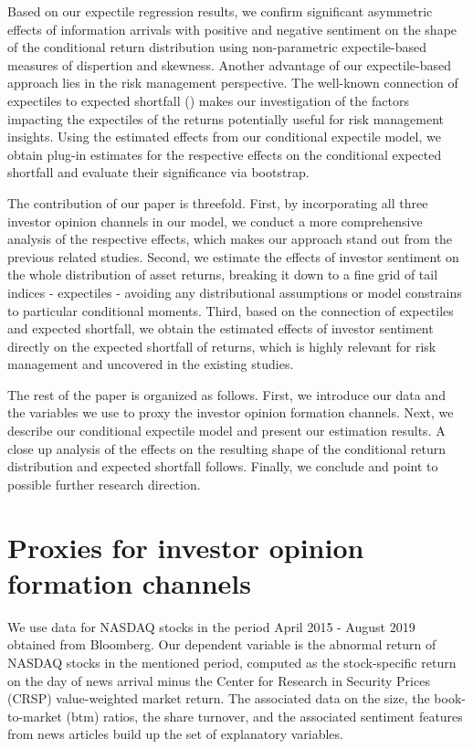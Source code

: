 \documentclass[11pt]{article}
\begin{document}
Based on our expectile regression results, we confirm significant asymmetric effects of information arrivals with positive and negative sentiment on the shape of the conditional return distribution using non-parametric expectile-based measures of dispertion and skewness. Another advantage of our expectile-based approach lies in the risk management perspective. The well-known connection of expectiles to expected shortfall (\cite{Taylor2008}) makes our investigation of the factors impacting the expectiles of the returns potentially useful for risk management insights. Using the estimated effects from our conditional expectile model, we obtain plug-in estimates for the respective effects on the conditional expected shortfall and evaluate their significance via bootstrap.

The contribution of our paper is threefold. First, by incorporating all three investor opinion channels in our model, we  conduct a more comprehensive analysis of the respective effects, which makes our approach stand out from the previous related studies. Second, we estimate the effects of investor sentiment on the whole distribution of asset returns, breaking it down to a fine grid of tail indices - expectiles - avoiding any distributional assumptions or model constrains to particular conditional moments. Third, based on the connection of expectiles and expected shortfall, we obtain the estimated effects of investor sentiment directly on the expected shortfall of returns, which is highly relevant for risk management and uncovered in the existing studies.

The rest of the paper is organized as follows. First, we introduce our data and the variables we use to proxy the investor opinion formation channels. Next, we describe our conditional expectile model and present our estimation results.  A close up analysis of the effects on the resulting shape of the conditional return distribution and expected shortfall follows. Finally, we conclude and point to possible further research direction.

\hypertarget{proxies-for-investor-opinion-channels}{%
\section{Proxies for investor opinion formation channels}\label{proxies-for-investor-opinion-channels}}

We use data for NASDAQ stocks in the period April 2015 - August 2019 obtained from Bloomberg.
Our dependent variable is the abnormal return of NASDAQ stocks in the mentioned period, computed as the stock-specific return on the day of news arrival minus the Center for Research in Security Prices (CRSP) value-weighted market return. The associated data on the size, the book-to-market (btm) ratios, the share turnover, and the associated sentiment features from news articles build up the set of explanatory variables.
\end{document}
